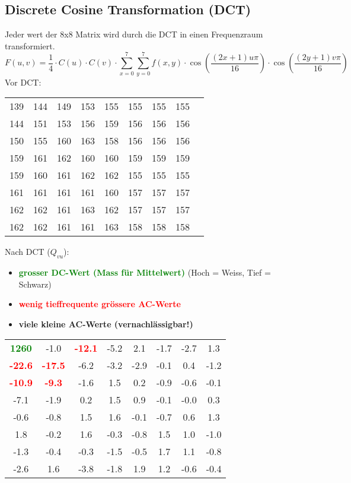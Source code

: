 \subsection{Discrete Cosine Transformation (DCT)}
Jeder wert der 8x8 Matrix wird durch die DCT in einen Frequenzraum transformiert.
\begin{equation*}
    F(u,v) = \frac{1}{4} \cdot C(u) \cdot C(v) \cdot \sum_{x=0}^{7} \sum_{y=0}^{7} f(x,y) \cdot \cos(\frac{(2x+1)u\pi}{16}) \cdot \cos(\frac{(2y+1)v\pi}{16})
\end{equation*}
Vor DCT:
\begin{center}
    \begin{tabular}{ c c c c c c c c c }
        139 & 144 & 149 & 153 & 155 & 155 & 155 & 155 \\
        144 & 151 & 153 & 156 & 159 & 156 & 156 & 156 \\
        150 & 155 & 160 & 163 & 158 & 156 & 156 & 156 \\
        159 & 161 & 162 & 160 & 160 & 159 & 159 & 159 \\
        159 & 160 & 161 & 162 & 162 & 155 & 155 & 155 \\
        161 & 161 & 161 & 161 & 160 & 157 & 157 & 157 \\
        162 & 162 & 161 & 163 & 162 & 157 & 157 & 157 \\
        162 & 162 & 161 & 161 & 163 & 158 & 158 & 158 \\
    \end{tabular}
\end{center}
Nach DCT ($Q_{vu}$):
\begin{itemize}
    \item \textbf{\textcolor{green}{grosser DC-Wert (Mass für Mittelwert)}} (Hoch = Weiss, Tief = Schwarz)
    \item \textbf{\textcolor{red}{wenig tieffrequente grössere AC-Werte}}
    \item \textbf{viele kleine AC-Werte (vernachlässigbar!)}
\end{itemize}
\begin{center}
    \begin{tabular}{ c c c c c c c c }
        \textcolor{green}{\textbf{1260}} & -1.0 & \textcolor{red}{\textbf{-12.1}} & -5.2 & 2.1 & -1.7 & -2.7 & 1.3 \\
        \textcolor{red}{\textbf{-22.6}} & \textcolor{red}{\textbf{-17.5}} & -6.2 & -3.2 & -2.9 & -0.1 & 0.4 & -1.2 \\
        \textcolor{red}{\textbf{-10.9}} & \textcolor{red}{\textbf{-9.3}} & -1.6 & 1.5 & 0.2 & -0.9 & -0.6 & -0.1 \\
        -7.1 & -1.9 & 0.2 & 1.5 & 0.9 & -0.1 & -0.0 & 0.3 \\
        -0.6 & -0.8 & 1.5 & 1.6 & -0.1 & -0.7 & 0.6 & 1.3 \\
        1.8 & -0.2 & 1.6 & -0.3 & -0.8 & 1.5 & 1.0 & -1.0 \\
        -1.3 & -0.4 & -0.3 & -1.5 & -0.5 & 1.7 & 1.1 & -0.8 \\
        -2.6 & 1.6 & -3.8 & -1.8 & 1.9 & 1.2 & -0.6 & -0.4 \\
    \end{tabular}
\end{center}
